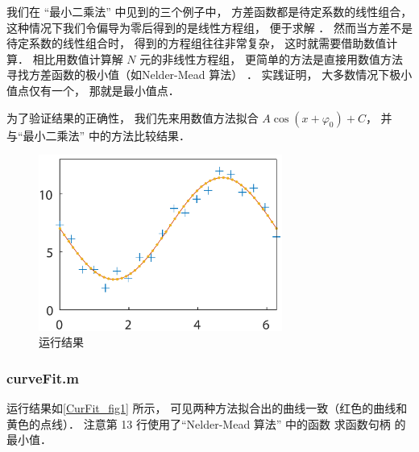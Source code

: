 

我们在 “最小二乘法” 中见到的三个例子中， 方差函数都是待定系数的线性组合， 这种情况下我们令偏导为零后得到的是线性方程组， 便于求解%
． 然而当方差不是待定系数的线性组合时， 得到的方程组往往非常复杂， 这时就需要借助数值计算． 相比用数值计算解 $N$ 元的非线性方程组， 更简单的方法是直接用数值方法寻找方差函数的极小值（如Nelder-Mead 算法） ． 实践证明， 大多数情况下极小值点仅有一个， 那就是最小值点．

为了验证结果的正确性， 我们先来用数值方法拟合 $A\cos (x + \varphi_0) + C$， 并与“最小二乘法” 中的方法比较结果．

\begin{figure}[ht]
\centering
\includegraphics[width=8cm]{./figures/CurFit.pdf}
\caption{运行结果} \label{CurFit_fig1}
\end{figure}

\subsubsection{curveFit.m}


运行结果如\autoref{CurFit_fig1} 所示， 可见两种方法拟合出的曲线一致（红色的曲线和黄色的点线）． 注意第 13 行使用了“Nelder-Mead 算法” 中的函数  求函数句柄  的最小值．